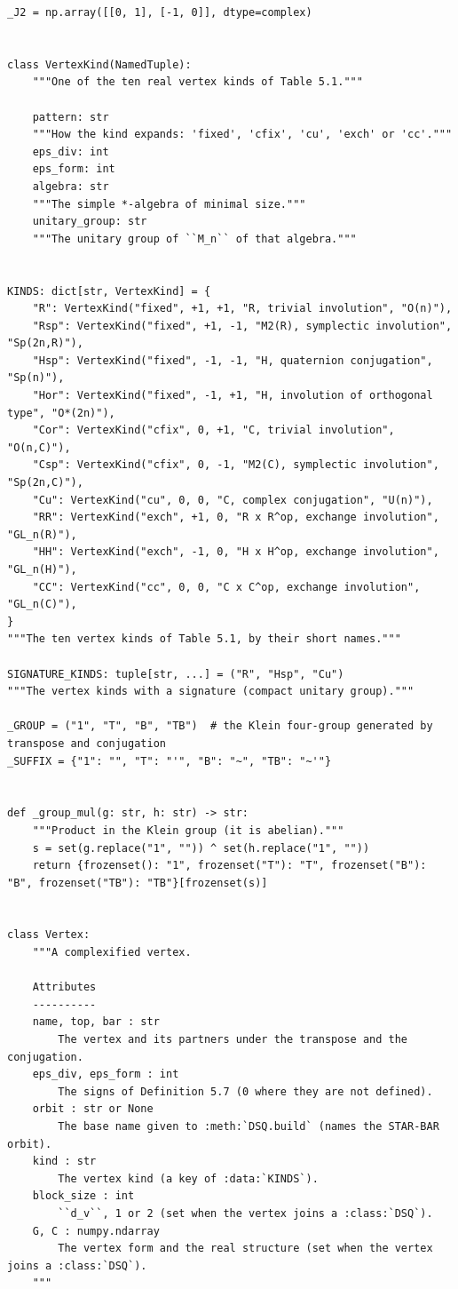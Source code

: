 \documentclass[12pt, a4paper]{report}
\theoremstyle{plain}
\theoremstyle{definition}
\theoremstyle{remark}
\theoremstyle{plain}
\begin{document}
\begin{lstlisting}[style=dsqcode]
_J2 = np.array([[0, 1], [-1, 0]], dtype=complex)


class VertexKind(NamedTuple):
    """One of the ten real vertex kinds of Table 5.1."""

    pattern: str
    """How the kind expands: 'fixed', 'cfix', 'cu', 'exch' or 'cc'."""
    eps_div: int
    eps_form: int
    algebra: str
    """The simple *-algebra of minimal size."""
    unitary_group: str
    """The unitary group of ``M_n`` of that algebra."""


KINDS: dict[str, VertexKind] = {
    "R": VertexKind("fixed", +1, +1, "R, trivial involution", "O(n)"),
    "Rsp": VertexKind("fixed", +1, -1, "M2(R), symplectic involution", "Sp(2n,R)"),
    "Hsp": VertexKind("fixed", -1, -1, "H, quaternion conjugation", "Sp(n)"),
    "Hor": VertexKind("fixed", -1, +1, "H, involution of orthogonal type", "O*(2n)"),
    "Cor": VertexKind("cfix", 0, +1, "C, trivial involution", "O(n,C)"),
    "Csp": VertexKind("cfix", 0, -1, "M2(C), symplectic involution", "Sp(2n,C)"),
    "Cu": VertexKind("cu", 0, 0, "C, complex conjugation", "U(n)"),
    "RR": VertexKind("exch", +1, 0, "R x R^op, exchange involution", "GL_n(R)"),
    "HH": VertexKind("exch", -1, 0, "H x H^op, exchange involution", "GL_n(H)"),
    "CC": VertexKind("cc", 0, 0, "C x C^op, exchange involution", "GL_n(C)"),
}
"""The ten vertex kinds of Table 5.1, by their short names."""

SIGNATURE_KINDS: tuple[str, ...] = ("R", "Hsp", "Cu")
"""The vertex kinds with a signature (compact unitary group)."""

_GROUP = ("1", "T", "B", "TB")  # the Klein four-group generated by transpose and conjugation
_SUFFIX = {"1": "", "T": "'", "B": "~", "TB": "~'"}


def _group_mul(g: str, h: str) -> str:
    """Product in the Klein group (it is abelian)."""
    s = set(g.replace("1", "")) ^ set(h.replace("1", ""))
    return {frozenset(): "1", frozenset("T"): "T", frozenset("B"): "B", frozenset("TB"): "TB"}[frozenset(s)]


class Vertex:
    """A complexified vertex.

    Attributes
    ----------
    name, top, bar : str
        The vertex and its partners under the transpose and the conjugation.
    eps_div, eps_form : int
        The signs of Definition 5.7 (0 where they are not defined).
    orbit : str or None
        The base name given to :meth:`DSQ.build` (names the STAR-BAR orbit).
    kind : str
        The vertex kind (a key of :data:`KINDS`).
    block_size : int
        ``d_v``, 1 or 2 (set when the vertex joins a :class:`DSQ`).
    G, C : numpy.ndarray
        The vertex form and the real structure (set when the vertex joins a :class:`DSQ`).
    """


\end{lstlisting}
\end{document}
